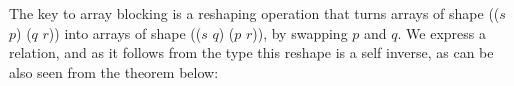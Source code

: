 The key to array blocking is a reshaping operation that turns arrays
of shape (($s$  $p$)  ($q$  $r$)) into arrays of shape 
(($s$  $q$)  ($p$  $r$)), by swapping $p$ and $q$.
We express a  relation, and as it follows from the type
this reshape is a self inverse, as can be also seen from the theorem below:
\begin{mathpar}
\end{mathpar}
